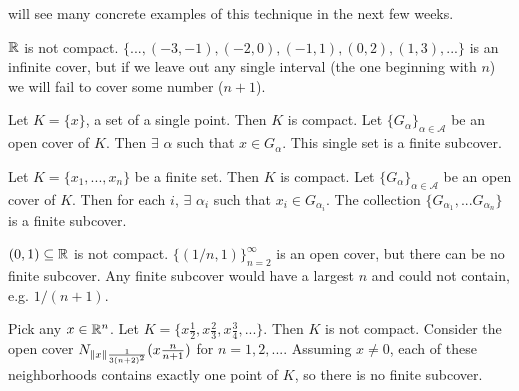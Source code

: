 will see many concrete examples of this technique in the next few
weeks.
\begin{example}
  $\mathbb{R}$ is not compact. $\{..., (-3, -1), (-2, 0),(-1,1), (0,2), (1,3),
  ... \}$ is an infinite cover, but if we leave out any single
  interval (the one beginning with $n$) we will fail to cover
  some number ($n+1$).
\end{example}
\begin{example}
  Let $K = \{x\}$, a set of a single point. Then $K$ is compact. Let
  $\{G_\alpha\}_{\alpha \in \mathcal{A}}$ be an open cover of
  $K$. Then $\exists$ $\alpha$ such that $x \in G_\alpha$. This single
  set is a finite subcover.
\end{example}
\begin{example}
  Let $K = \{x_1, ..., x_n\}$ be a finite set. Then $K$ is
  compact.  Let
  $\{G_\alpha\}_{\alpha \in \mathcal{A}}$ be an open cover of
  $K$. Then for each $i$, $\exists$ $\alpha_i$ such that $x_i \in
  G_{\alpha_i}$. 
  The collection $\{G_{\alpha_1}, ... G_{\alpha_n} \}$ is a finite
  subcover.
\end{example}
\begin{example}
  $(0,1) \subseteq \mathbb{R}$ is not compact. $\{(1/n,1)\}_{n=2}^\infty$ is
  an open cover, but there can be no finite subcover. Any finite
  subcover would have a largest $n$ and could not contain,
  e.g. $1/(n+1)$. 
\end{example}
\begin{example}
  Pick any $x \in \mathbb{R}^n$. Let $K = \{x\frac{1}{2},
  x\frac{2}{3}, x\frac{3}{4}, ... \}$. Then $K$ is not
  compact. Consider the open cover $N_{\left\Vert {x} \right\Vert\frac{1}{3(n+2)^2}}(x
  \frac{n}{n+1})$ for $n=1,2, ...$. Assuming $x \neq 0$, each of these
  neighborhoods contains exactly one point of $K$, so there is no
  finite subcover. 
\end{example}



